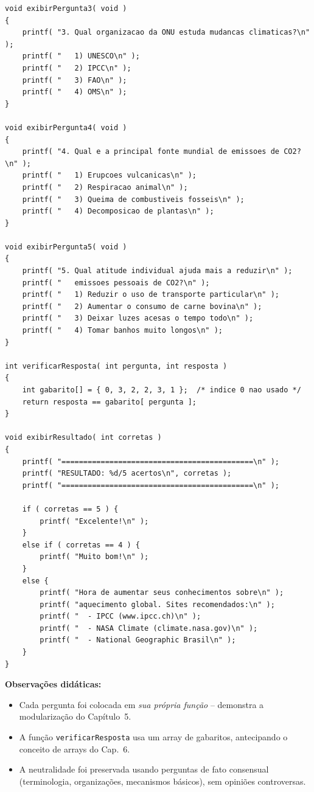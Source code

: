 \documentclass[12pt,a4paper]{article}
\begin{document}
\begin{respostabox}
\begin{lstlisting}
void exibirPergunta3( void )
{
    printf( "3. Qual organizacao da ONU estuda mudancas climaticas?\n" );
    printf( "   1) UNESCO\n" );
    printf( "   2) IPCC\n" );
    printf( "   3) FAO\n" );
    printf( "   4) OMS\n" );
}

void exibirPergunta4( void )
{
    printf( "4. Qual e a principal fonte mundial de emissoes de CO2?\n" );
    printf( "   1) Erupcoes vulcanicas\n" );
    printf( "   2) Respiracao animal\n" );
    printf( "   3) Queima de combustiveis fosseis\n" );
    printf( "   4) Decomposicao de plantas\n" );
}

void exibirPergunta5( void )
{
    printf( "5. Qual atitude individual ajuda mais a reduzir\n" );
    printf( "   emissoes pessoais de CO2?\n" );
    printf( "   1) Reduzir o uso de transporte particular\n" );
    printf( "   2) Aumentar o consumo de carne bovina\n" );
    printf( "   3) Deixar luzes acesas o tempo todo\n" );
    printf( "   4) Tomar banhos muito longos\n" );
}

int verificarResposta( int pergunta, int resposta )
{
    int gabarito[] = { 0, 3, 2, 2, 3, 1 };  /* indice 0 nao usado */
    return resposta == gabarito[ pergunta ];
}

void exibirResultado( int corretas )
{
    printf( "============================================\n" );
    printf( "RESULTADO: %d/5 acertos\n", corretas );
    printf( "============================================\n" );

    if ( corretas == 5 ) {
        printf( "Excelente!\n" );
    }
    else if ( corretas == 4 ) {
        printf( "Muito bom!\n" );
    }
    else {
        printf( "Hora de aumentar seus conhecimentos sobre\n" );
        printf( "aquecimento global. Sites recomendados:\n" );
        printf( "  - IPCC (www.ipcc.ch)\n" );
        printf( "  - NASA Climate (climate.nasa.gov)\n" );
        printf( "  - National Geographic Brasil\n" );
    }
}
\end{lstlisting}

\textbf{Observações didáticas:}
\begin{itemize}[noitemsep]
  \item Cada pergunta foi colocada em \textit{sua própria função} -- demonstra a
  modularização do Capítulo~5.
  \item A função \texttt{verificarResposta} usa um array de gabaritos, antecipando
  o conceito de arrays do Cap.~6.
  \item A neutralidade foi preservada usando perguntas de fato consensual
  (terminologia, organizações, mecanismos básicos), sem opiniões controversas.
\end{itemize}
\end{respostabox}
\end{document}

